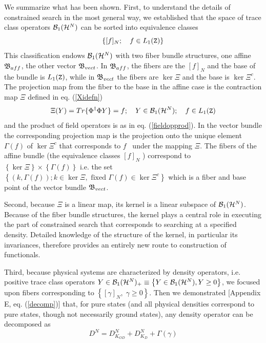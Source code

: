 We summarize what has been shown. First, to understand the details of
constrained search in the most general way, we established that the space of
trace class operators ${\cal B}_{1}({\cal H}^{N})$ can be sorted into
equivalence classes 
\begin{equation}
\left\{ \lbrack f]_{N};\quad f\in L_{1}({\tt Z})\right\}  \label{summequiv}
\end{equation}%
This classification endows ${\cal B}_{1}({\cal H}^{N})$ with two fiber
bundle structures, one affine ${\frak B}_{aff}$, the other vector ${\frak B}%
_{vect}$. In ${\frak B}_{aff}$, the fibers are the $[f]_{N}$ and the base of
the bundle is $L_{1}({\tt Z})$, while in ${\frak B}_{vect}$ the fibers are $%
\ker \Xi $ and the base is $\ker \Xi ^{c}$. The projection map from the
fiber to the base in the affine case is the contraction map $\Xi $ defined
in eq. (\ref{Xidefn}) 
\begin{equation}
\Xi (Y)=Tr\{\Phi ^{\dagger }\Phi Y\}=f;\quad Y\in {\cal B}_{1}({\cal H}%
^{N});\quad f\in L_{1}({\tt Z})  \label{summXidefn}
\end{equation}%
and the product of field operators is as in eq. (\ref{fieldopprod}). In the
vector bundle the corresponding projection map is the projection onto the
unique element $\Gamma \left( f\right) $ of $\ker \Xi ^{c}$ that corresponds
to $f$ \ under the mapping $\Xi $. The fibers of the affine bundle (the
equivalence classes $[f]_{N}$ ) correspond to $\left\{ \ker \Xi \right\}
\times \left\{ \Gamma \left( f\right) \right\} $ i.e. the set $\left\{
\left( k,\Gamma \left( f\right) \right) ;k\in \ker \Xi ,\text{ fixed }\Gamma
\left( f\right) \in \ker \Xi ^{c}\right\} $ which is a fiber and base point
of the vector bundle ${\frak B}_{vect}$.

Second, because $\Xi $ is a linear map, its kernel is a linear subspace of $%
{\cal B}_{1}({\cal H}^{N})$. Because of the fiber bundle structures, the
kernel plays a central role in executing the part of constrained search that
corresponds to searching at a specified density. Detailed knowledge of the
structure of the kernel, in particular its invariances, therefore provides
an entirely new route to construction of functionals.

Third, because physical systems are characterized by density operators, i.e.
positive trace class operators $Y\in {\cal B}_{1}({\cal H}^{N})_{+}\equiv
\left\{ Y\in {\cal B}_{1}({\cal H}^{N}),Y\geq 0\right\} $, we focused upon
fibers corresponding to $\left\{ [\gamma ]_{N},\;\gamma \geq 0\right\} $.
Then we demonstrated [Appendix E, eq. (\ref{decomp})] that, for pure states
(and all physical densities correspond to pure states, though not
necessarily ground states), any density operator can be decomposed as 
\begin{equation}
D^{N}=D_{K_{OD}}^{N}+D_{K_{D}}^{N}+\Gamma \left( \gamma \right)
\end{equation}

